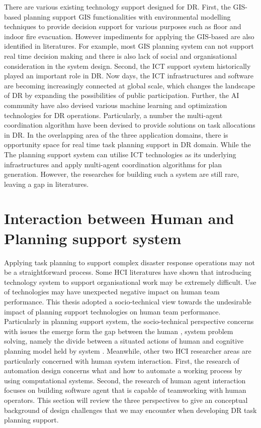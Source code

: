 There are various existing technology support designed for \ac{DR}. First, the \ac{GIS}-based planning support \ac{GIS} functionalities with environmental modelling techniques to provide decision support for various purposes such as floor and indoor fire evacuation. However impediments for applying the \ac{GIS}-based are also identified in literatures. For example, most \ac{GIS} planning system can not support real time decision making and there is also lack of social and organisational consideration in the system design. Second, the \ac{ICT} support system historically played an important role in \ac{DR}. Now days, the \ac{ICT} infrastructures and software are becoming increasingly connected at global scale, which changes the landscape of \ac{DR} by expanding the possibilities of public participation. Further, the \ac{AI} community have also devised various machine learning and optimization technologies for \ac{DR} operations. Particularly, a number the multi-agent coordination algorithm have been devised to provide solutions on task allocations in \ac{DR}. In the overlapping area of the three application domains, there is opportunity space for real time task planning support in \ac{DR} domain. While the The planning support system can utilise \ac{ICT} technologies as its underlying infrastructures and apply multi-agent coordination algorithms for plan generation. However, the researches for building such a system are still rare, leaving a gap in literatures.\\

\chapter{Interaction between Human and Planning support system}

Applying task planning to support complex disaster response operations may not be a straightforward process. Some \ac{HCI} literatures \cite{Ackerman2000,Bowers1994,Niazkhani2009} have shown that introducing technology system to support organisational work may be extremely difficult. Use of technologies may have unexpected negative impact on human team performance. This thesis adopted a socio-technical view towards the undesirable impact of planning support technologies on human team performance. Particularly in planning support system, the socio-technical perspective concerns with issues the emerge form the gap between the human , system problem solving, namely the divide between a situated actions of human and cognitive planning model held by system \cite{Suchman1987}. Meanwhile, other two \ac{HCI} researcher areas are particularly concerned with human system interaction. First, the research of automation design  concerns what and how to automate a working process by using computational systems. Second, the research of human agent interaction focuses on building software agent that is capable of teamworking with human operators. This section will review the three perspectives to give an conceptual background of design challenges that we may encounter when developing DR task planning support.\\

